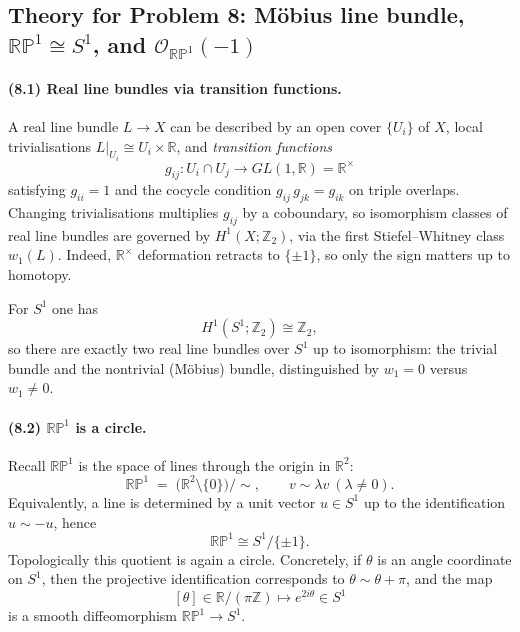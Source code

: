 \documentclass[12pt,a4paper]{article}
\theoremstyle{plain}
\theoremstyle{definition}      %
\begin{document}

\subsection*{Theory for Problem 8: Möbius line bundle, $\mathbb{RP}^1 \cong S^1$, and $\mathcal{O}_{\mathbb{RP}^1}(-1)$}

\paragraph{(8.1) Real line bundles via transition functions.}
A real line bundle $L\to X$ can be described by an open cover $\{U_i\}$ of $X$, local trivialisations
$L|_{U_i}\cong U_i\times \mathbb{R}$, and \emph{transition functions}
\[
g_{ij}:U_i\cap U_j \longrightarrow GL(1,\mathbb{R})=\mathbb{R}^\times
\]
satisfying $g_{ii}=1$ and the cocycle condition $g_{ij}\,g_{jk}=g_{ik}$ on triple overlaps.
Changing trivialisations multiplies $g_{ij}$ by a coboundary, so isomorphism classes of real line bundles
are governed by $H^1(X;\mathbb{Z}_2)$, via the first Stiefel--Whitney class $w_1(L)$.
Indeed, $\mathbb{R}^\times$ deformation retracts to $\{\pm 1\}$, so only the sign matters up to homotopy.

For $S^1$ one has
\[
H^1(S^1;\mathbb{Z}_2)\cong \mathbb{Z}_2,
\]
so there are exactly two real line bundles over $S^1$ up to isomorphism: the trivial bundle and the
nontrivial (Möbius) bundle, distinguished by $w_1=0$ versus $w_1\neq 0$.

\paragraph{(8.2) $\mathbb{RP}^1$ is a circle.}
Recall $\mathbb{RP}^1$ is the space of lines through the origin in $\mathbb{R}^2$:
\[
\mathbb{RP}^1 \;=\; \bigl(\mathbb{R}^2\setminus\{0\}\bigr)/\sim,\qquad v\sim \lambda v\ (\lambda\neq 0).
\]
Equivalently, a line is determined by a unit vector $u\in S^1$ up to the identification $u\sim -u$, hence
\[
\mathbb{RP}^1 \cong S^1/\{\pm 1\}.
\]
Topologically this quotient is again a circle. Concretely, if $\theta$ is an angle coordinate on $S^1$,
then the projective identification corresponds to $\theta\sim \theta+\pi$, and the map
\[
[\theta]\in \mathbb{R}/(\pi\mathbb{Z}) \longmapsto e^{2i\theta}\in S^1
\]
is a smooth diffeomorphism $\mathbb{RP}^1\to S^1$.
\end{document}

